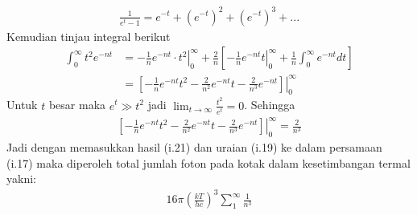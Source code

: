 \documentclass[a4paper , 12 pt]{article}
\begin{document}
\begin{enumerate}
\begin{align}
\frac{1}{e^t - 1} = e^{-t}+ (e^{-t} )^2 + (e^{-t})^3 + ...  \nonumber \tag{i.19}
\end{align}
Kemudian tinjau integral berikut 
\begin{align}
\int_0^\infty t^2 e^{-n t } &=   \left. - \frac{1}{n} e^{-nt} \cdot t^2 \right \vert_0^\infty + \frac{2}{n}  \left [\left. -\frac{1}{n} e^{-n t} t \right \vert_0^\infty + \frac{1}{n} \int_{0}^{\infty}  e^{-nt} dt \right ] \nonumber \\
& = \left. \left [ -  \frac{1}{n} e^{-n t} t^2 - \frac{2}{n^2} e^{-nt} t - \frac{2}{n^3} e^{-nt}  \right] \right \vert_0^\infty \nonumber \tag{i.20}
\end{align}
Untuk $t$ besar maka $e^t \gg t^2$ jadi $\displaystyle \lim_{t \rightarrow \infty} \frac{t^2}{e^t} = 0$. Sehingga 
\begin{align}
 \left. \left [- \frac{1}{n} e^{-n t} t^2 - \frac{2}{n^2} e^{-nt} t - \frac{2}{n^3} e^{-nt}  \right] \right \vert_0^\infty = \frac{2}{n^3} \tag{i.21}
\end{align}
Jadi dengan memasukkan hasil (i.21) dan uraian (i.19) ke dalam persamaan (i.17) maka diperoleh total jumlah foton pada kotak dalam kesetimbangan termal  yakni:
\begin{align}
16 \pi \left(\frac{kT}{hc}\right)^3 \sum_1^\infty \frac{1}{n^3} \tag{QED}
\end{align}
\end{enumerate}
\end{document}
